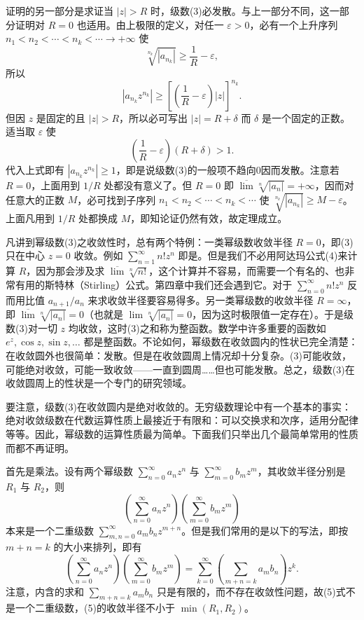 证明的另一部分是求证当 $|z|>R$ 时，级数(3)必发散。与上一部分不同，这一部分证明对 $R=0$ 也适用。由上极限的定义，对任一 $\varepsilon>0$，必有一个上升序列 $n_1<n_2<\cdots<n_k<\cdots\to+\infty$ 使
\[
 \sqrt[n_k]{|a_{n_k}|}\ge\frac1R-\varepsilon,
\]
所以
\[
 |a_{n_k}z^{n_k}|\ge\left[\left(\frac1R-\varepsilon\right)|z|\right]^{n_k}.
\]
但因 $z$ 是固定的且 $|z|>R$，所以必可写出 $|z|=R+\delta$ 而 $\delta$ 是一个固定的正数。适当取 $\varepsilon$ 使
\[
 \left(\frac1R-\varepsilon\right)(R+\delta)>1.
\]
代入上式即有 $|a_{n_k}z^{n_k}|\ge1$，即是说级数(3)的一般项不趋向0因而发散。注意若 $R=0$，上面用到 $1/R$ 处都没有意义了。但 $R=0$ 即 $\overline{\lim}\sqrt[n]{|a_n|}=+\infty$，因而对任意大的正数 $M$，必可找到子序列 $n_1<n_2<\cdots<n_k<\cdots$ 使 $\sqrt[n_k]{|a_{n_k}|}\ge M-\varepsilon$。上面凡用到 $1/R$ 处都换成 $M$，即知论证仍然有效，故定理成立。

凡讲到幂级数(3)之收敛性时，总有两个特例：一类幂级数收敛半径 $R=0$，即(3)只在中心 $z=0$ 收敛。例如 $\sum_{n=1}^{\infty}n!z^n$ 即是。但是我们不必用阿达玛公式(4)来计算 $R$，因为那会涉及求 $\overline{\lim}\sqrt[n]{n!}$，这个计算并不容易，而需要一个有名的、也非常有用的斯特林（Stirling）公式。第四章中我们还会遇到它。对于 $\sum_{n=0}^{\infty}n!z^n$ 反而用比值 $a_{n+1}/a_n$ 来求收敛半径要容易得多。另一类幂级数的收敛半径 $R=\infty$，即 $\overline{\lim}\sqrt[n]{|a_n|}=0$（也就是 $\lim\sqrt[n]{|a_n|}=0$，因为这时极限值一定存在）。于是级数(3)对一切 $z$ 均收敛，这时(3)之和称为整函数。数学中许多重要的函数如 $e^z,\cos z,\sin z,\ldots$ 都是整函数。不论如何，幂级数在收敛圆内的性状已完全清楚：在收敛圆外也很简单：发散。但是在收敛圆周上情况却十分复杂。(3)可能收敛，可能绝对收敛，可能一致收敛——一直到圆周……但也可能发散。总之，级数(3)在收敛圆周上的性状是一个专门的研究领域。

要注意，级数(3)在收敛圆内是绝对收敛的。无穷级数理论中有一个基本的事实：绝对收敛级数在代数运算性质上最接近于有限和：可以交换求和次序，适用分配律等等。因此，幂级数的运算性质最为简单。下面我们只举出几个最简单常用的性质而都不再证明。

首先是乘法。设有两个幂级数 $\sum_{n=0}^{\infty}a_nz^n$ 与 $\sum_{m=0}^{\infty}b_mz^m$，其收敛半径分别是 $R_1$ 与 $R_2$，则
\[
 \left(\sum_{n=0}^{\infty}a_nz^n\right)\left(\sum_{m=0}^{\infty}b_mz^m\right)
\]
本来是一个二重级数 $\sum_{m,n=0}^{\infty}a_mb_nz^{m+n}$。但是我们常用的是以下的写法，即按 $m+n=k$ 的大小来排列，即有
\begin{equation}
 \left(\sum_{n=0}^{\infty}a_nz^n\right)\left(\sum_{m=0}^{\infty}b_mz^m\right)
 =\sum_{k=0}^{\infty}\left(\sum_{m+n=k}a_mb_n\right)z^k.
 \tag{5}
\end{equation}
注意，内含的求和 $\sum_{m+n=k}a_mb_n$ 只是有限的，而不存在收敛性问题，故(5)式不是一个二重级数，(5)的收敛半径不小于 $\min(R_1,R_2)$。

